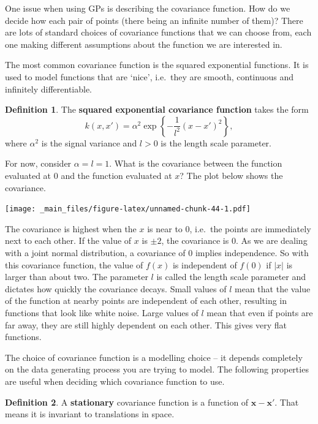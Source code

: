 \documentclass[
]{book}
\theoremstyle{definition}
\newtheorem{definition}{Definition}[chapter]
\theoremstyle{definition}
\theoremstyle{definition}
\theoremstyle{definition}
\theoremstyle{remark}
\begin{document}
One issue when using GPs is describing the covariance function. How do we decide how each pair of points (there being an infinite number of them)? There are lots of standard choices of covariance functions that we can choose from, each one making different assumptions about the function we are interested in.

The most common covariance function is the squared exponential functions. It is used to model functions that are `nice', i.e.~they are smooth, continuous and infinitely differentiable.

\begin{definition}
The \textbf{squared exponential covariance function} takes the form
\[
k(x, x') = \alpha^2\exp\left\{-\frac{1}{l^2}(x-x')^2\right\},
\]
where \(\alpha^2\) is the signal variance and \(l>0\) is the length scale parameter.
\end{definition}

For now, consider \(\alpha = l = 1\). What is the covariance between the function evaluated at 0 and the function evaluated at \(x\)? The plot below shows the covariance.

\texttt{[image: \_main\_files/figure-latex/unnamed-chunk-44-1.pdf]}

The covariance is highest when the \(x\) is near to 0, i.e.~the points are immediately next to each other. If the value of \(x\) is \(\pm 2\), the covariance is 0. As we are dealing with a joint normal distribution, a covariance of 0 implies independence. So with this covariance function, the value of \(f(x)\) is independent of \(f(0)\) if \(|x|\) is larger than about two. The parameter \(l\) is called the length scale parameter and dictates how quickly the covariance decays. Small values of \(l\) mean that the value of the function at nearby points are independent of each other, resulting in functions that look like white noise. Large values of \(l\) mean that even if points are far away, they are still highly dependent on each other. This gives very flat functions.

The choice of covariance function is a modelling choice -- it depends completely on the data generating process you are trying to model. The following properties are useful when deciding which covariance function to use.

\begin{definition}
A \textbf{stationary} covariance function is a function of \(\boldsymbol{x} - \boldsymbol{x}'\). That means it is invariant to translations in space.
\end{definition}
\end{document}
